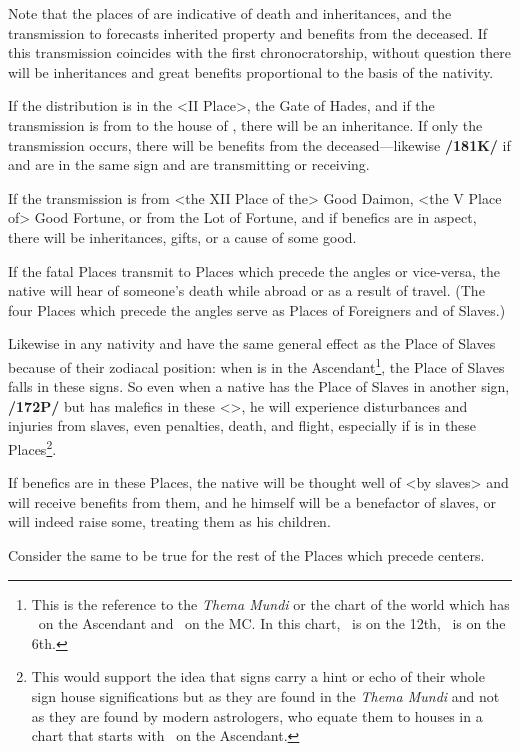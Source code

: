 Note that the places of \Saturn\xspace are indicative of death and inheritances, and the transmission to \Jupiter\xspace forecasts inherited property and benefits from the deceased.
If this transmission coincides with the first chronocratorship, without question there will be inheritances and great benefits proportional to the basis of the nativity. 

If the distribution is in the <II Place>, the Gate of Hades, and if the transmission is from \Saturn\xspace to the house of \Jupiter, there will be an inheritance. If only
the transmission occurs, there will be benefits from the deceased—likewise \textbf{/181K/} if \Saturn\xspace and \Jupiter\xspace are in the same sign and are transmitting or receiving.

If the transmission is from <the XII Place of the> Good Daimon, <the V Place of> Good Fortune, or from the Lot of Fortune, and if benefics are in aspect, there will be inheritances, gifts, or a cause of some good. 

If the fatal Places transmit to Places which precede the angles or vice-versa, the native will hear of someone’s death while abroad or as a result of travel. (The four Places which precede the angles serve as Places of Foreigners and of Slaves.)

 Likewise in any nativity \Gemini\xspace and \Sagittarius\xspace have the same general effect as the Place of Slaves because of their zodiacal position: when \Cancer\xspace is in the Ascendant\footnote{This is the reference to the \textsl{Thema Mundi} or the chart of the world which has \Cancer\, on the Ascendant and \Aries\, on the MC. In this chart, \Gemini\, is on the 12th, \Sagittarius\, is on the 6th.}, the Place of Slaves falls in these signs. So even when a native has the Place of Slaves in another sign, \textbf{/172P/} but has malefics in these <\Gemini\xspace [or] \Sagittarius>, he will experience disturbances and injuries from slaves, even penalties, death, and flight, especially if \Saturn\xspace is in these Places\footnote{This would support the idea that signs carry a hint or echo of their whole sign house significations but as they are found in the \textsl{Thema Mundi} and not as they are found by modern astrologers, who equate them to houses in a chart that starts with \Aries\, on the Ascendant.}. 
 
 If benefics are in these Places, the native will be thought well of <by slaves> and will receive benefits from them, and he himself will be a benefactor of slaves, or will indeed raise some, treating them as his children.
 
Consider the same to be true for the rest of the Places which precede centers.

\newpage